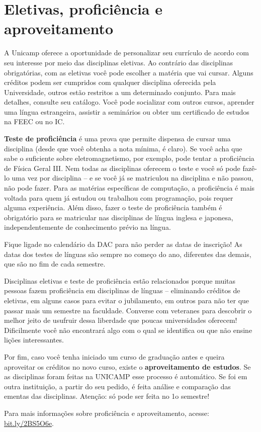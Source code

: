 \section{Eletivas, proficiência e aproveitamento}

A Unicamp oferece a oportunidade de personalizar seu currículo de acordo com seu interesse por meio das disciplinas eletivas. Ao contrário das disciplinas obrigatórias, com as eletivas você pode escolher a matéria que vai cursar. Alguns créditos podem ser cumpridos com qualquer disciplina oferecida pela Universidade, outros estão restritos a um determinado conjunto. Para mais detalhes, consulte seu catálogo. Você pode socializar com outros cursos, aprender uma língua estrangeira, assistir a seminários ou obter um certificado de estudos na FEEC ou no IC.

\textbf{Teste de proficiência} é uma prova que permite dispensa de cursar uma disciplina (desde que você obtenha a nota mínima, é claro). Se você acha que sabe o suficiente sobre eletromagnetismo, por exemplo, pode tentar a proficiência de Física Geral III. Nem todas as disciplinas oferecem o teste e você só pode fazê-lo uma vez por disciplina – e se você já se matriculou na disciplina e não passou, não pode fazer. Para as matérias específicas de computação, a proficiência é mais voltada para quem já estudou ou trabalhou com programação, pois requer alguma experiência. Além disso, fazer o teste de proficiência também é obrigatório para se matricular nas disciplinas de língua inglesa e japonesa, independentemente de conhecimento prévio na língua.

Fique ligade no calendário da DAC para não perder as datas de inscrição! As datas dos testes de línguas são sempre no começo do ano, diferentes das demais, que são no fim de cada semestre. 

Disciplinas eletivas e teste de proficiência estão relacionados porque muitas pessoas fazem proficiência em disciplinas de línguas – eliminando créditos de eletivas, em alguns casos para evitar o jubilamento, em outros para não ter que passar mais um semestre na faculdade. Converse com veteranes para descobrir o melhor jeito de usufruir dessa liberdade que poucas universidades oferecem! Dificilmente você não encontrará algo com o qual se identifica ou que não ensine lições interessantes.

Por fim, caso você tenha iniciado um curso de graduação antes e queira aproveitar os créditos no novo curso, existe o \textbf{aproveitamento de estudos}. Se as disciplinas foram feitas na UNICAMP esse processo é automático. Se foi em outra instituição, a partir do seu pedido, é feita análise e comparação das ementas das disciplinas. Atenção: só pode ser feita no 1o semestre!

Para mais informações sobre proficiência e aproveitamento, acesse: \url{bit.ly/2BS5O6e}.